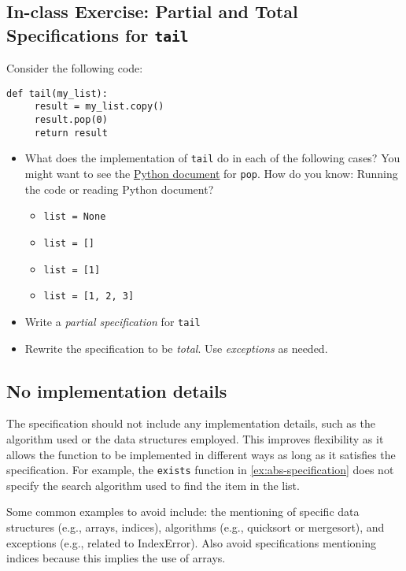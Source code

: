 \documentclass[oneside,11pt,dvipsnames]{book}
\newcommand{\code}[1]{\texttt{#1}}
\begin{document}
\subsection{In-class Exercise: Partial and Total Specifications for \code{tail}}

Consider the following code:

\begin{lstlisting}
def tail(my_list):
     result = my_list.copy()
     result.pop(0)
     return result
\end{lstlisting}

\begin{itemize}
     \item What does the implementation of \code{tail} do in each of the following cases? You might want to see the \href{https://docs.python.org/3/tutorial/datastructures.html}{Python document} for \code{pop}.  How do you know: Running the code or reading Python document?
     \begin{itemize}
         \item \code{list = None}
         \item \code{list = []}
         \item \code{list = [1]}  
         \item \code{list = [1, 2, 3]}
     \end{itemize}
     \item Write a \emph{partial specification} for \code{tail}
     \item Rewrite the specification to be \emph{total}. Use \emph{exceptions} as needed.
    \end{itemize}

\subsection{No implementation details}
The specification should not include any implementation details, such as the algorithm used or the data structures employed. This improves flexibility as it allows the function to be implemented in different ways as long as it satisfies the specification. For example, the \code{exists} function in \autoref{ex:abs-specification} does not specify the search algorithm used to find the item in the list.

Some common examples to avoid include: the mentioning of specific data structures (e.g., arrays, indices), algorithms (e.g., quicksort or mergesort), and exceptions (e.g., related to IndexError). Also avoid specifications mentioning indices because this implies the use of arrays.
\end{document}
